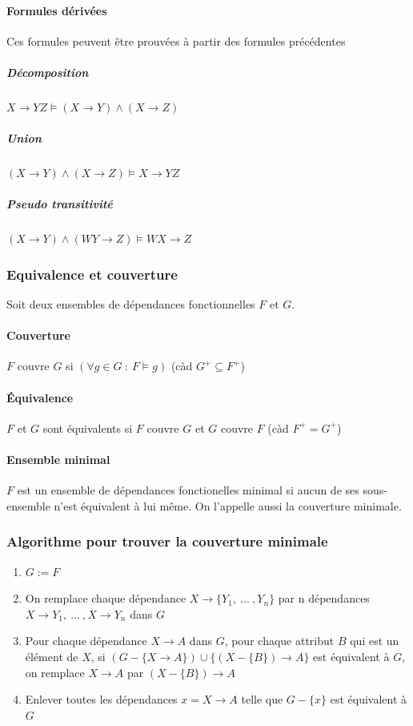 \documentclass[a4paper]{article}
\begin{document}
\paragraph{Formules dérivées}
Ces formules peuvent être prouvées à partir des formules précédentes
\subparagraph{Décomposition} $ X \rightarrow YZ \models (X \rightarrow Y) \land (X \rightarrow Z) $
\subparagraph{Union} $ (X \rightarrow Y) \land (X \rightarrow Z) \models X \rightarrow YZ $
\subparagraph{Pseudo transitivité} $ (X \rightarrow Y) \land (WY \rightarrow Z) \models WX \rightarrow Z $

\subsubsection{Equivalence et couverture}
Soit deux ensembles de dépendances fonctionnelles $F$ et $G$.
\paragraph{Couverture} $F$ couvre $G$ si $(\forall g \in G~:~F \models g)$ (càd $G^+ \subseteq F^+$)
\paragraph{\'Equivalence} $F$ et $G$ sont équivalents si $F$ couvre $G$ et $G$ couvre $F$ (càd $F^+ = G^+$)
\paragraph{Ensemble minimal} $F$ est un ensemble de dépendances fonctionelles minimal
si aucun de ses sous-ensemble n'est équivalent à lui même. On l'appelle aussi la
couverture minimale.

\subsubsection{Algorithme pour trouver la couverture minimale}
\begin{enumerate}
  \item $G := F$
  \item On remplace chaque dépendance $X \rightarrow \{Y_1,~...~,Y_n\}$ par n dépendances
        $X \rightarrow Y_1,~...~, X \rightarrow Y_n$ dans $G$
  \item Pour chaque dépendance $X \rightarrow A$ dans $G$, pour chaque attribut $B$
        qui est un élément de $X$, si $(G-\{X\rightarrow A\})\cup\{(X-\{B\}) \rightarrow A\}$ est
        équivalent à $G$, on remplace $X \rightarrow A $ par $(X-\{B\}) \rightarrow A$
  \item Enlever toutes les dépendances $x = X \rightarrow A$ telle que $G-\{x\}$ est équivalent à $G$ 
\end{enumerate}
\end{document}
